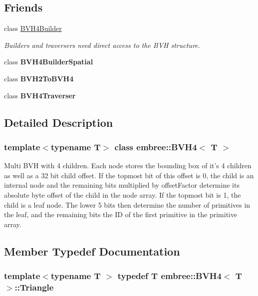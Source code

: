 \subsection*{Friends}
\begin{DoxyCompactItemize}
\item 
class \hyperlink{classembree_1_1_b_v_h4_ad7711da6280bf0506c116454f50815ad}{BVH4Builder}
\begin{DoxyCompactList}\small\item\em Builders and traversers need direct access to the BVH structure. \item\end{DoxyCompactList}\item 
\hypertarget{classembree_1_1_b_v_h4_a5848866b5ef7d9872d8553d537a752f5}{
class {\bfseries BVH4BuilderSpatial}}
\label{classembree_1_1_b_v_h4_a5848866b5ef7d9872d8553d537a752f5}

\item 
\hypertarget{classembree_1_1_b_v_h4_abcee8cef5aed865bf7be323048aee100}{
class {\bfseries BVH2ToBVH4}}
\label{classembree_1_1_b_v_h4_abcee8cef5aed865bf7be323048aee100}

\item 
\hypertarget{classembree_1_1_b_v_h4_a00000c96b3686d92966102966260d893}{
class {\bfseries BVH4Traverser}}
\label{classembree_1_1_b_v_h4_a00000c96b3686d92966102966260d893}

\end{DoxyCompactItemize}


\subsection{Detailed Description}
\subsubsection*{template$<$typename T$>$ class embree::BVH4$<$ T $>$}

Multi BVH with 4 children. Each node stores the bounding box of it's 4 children as well as a 32 bit child offset. If the topmost bit of this offset is 0, the child is an internal node and the remaining bits multiplied by offsetFactor determine its absolute byte offset of the child in the node array. If the topmost bit is 1, the child is a leaf node. The lower 5 bits then determine the number of primitives in the leaf, and the remaining bits the ID of the first primitive in the primitive array. 

\subsection{Member Typedef Documentation}
\hypertarget{classembree_1_1_b_v_h4_a8967105dba389a8f0dc85ee53eee7345}{
\subsubsection[{Triangle}]{\setlength{\rightskip}{0pt plus 5cm}template$<$typename T $>$ typedef T {\bf embree::BVH4}$<$ T $>$::{\bf Triangle}}}
\label{classembree_1_1_b_v_h4_a8967105dba389a8f0dc85ee53eee7345}


